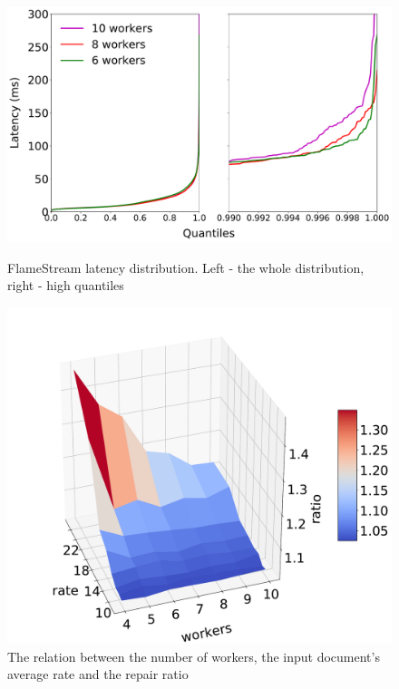 \begin{figure}[ht]
  \centering
  \begin{minipage}[b]{.6\textwidth}
    \centering
    \includegraphics[width=\linewidth]{pics/fs-index-quantiles}
    \caption{FlameStream latency distribution. Left - the whole distribution, right - high quantiles}
    \label{fs-index-quantiles}
  \end{minipage}%
  \begin{minipage}[b]{.40\textwidth}
    \centering
    \includegraphics[width=\linewidth]{pics/overhead}
    \caption{The relation between the number of workers, the input document's average rate and the repair ratio}
    \label{overhead}
  \end{minipage}%
\end{figure}

